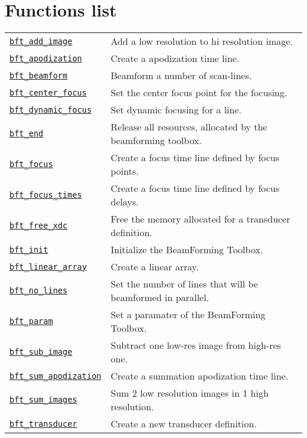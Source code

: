\documentclass{manual}
\begin{document}
\section{Functions list}
\begin{tabular}[t]{lp{14cm}}
 \hyperlink{bft_add_image}{\tt bft\_add\_image}      & Add a low resolution to hi resolution image.\\
 \hyperlink{bft_apodization}{\tt bft\_apodization}     & Create a  apodization time line. \\
 \hyperlink{bft_beamform}{\tt bft\_beamform}        & Beamform a number of scan-lines. \\
 \hyperlink{bft_center_focus}{\tt bft\_center\_focus}   & Set the center focus point for the focusing. \\
 \hyperlink{bft_dynamic_focus}{\tt bft\_dynamic\_focus}  & Set dynamic focusing for a line. \\
 \hyperlink{bft_end}{\tt bft\_end}             & Release all resources, allocated by the beamforming toolbox.\\
 \hyperlink{bft_focus}{\tt bft\_focus}           & Create a focus time line defined by focus points.\\
 \hyperlink{bft_focus_times}{\tt bft\_focus\_times}    & Create a focus time line defined by focus delays.\\
 \hyperlink{bft_free_xdc}{\tt bft\_free\_xdc}       & Free the memory allocated for a transducer definition.\\
 \hyperlink{bft_init}{\tt bft\_init}            & Initialize the BeamForming Toolbox.\\
 \hyperlink{bft_linear_array}{\tt bft\_linear\_array}   & Create a linear array.\\
 \hyperlink{bft_no_lines}{\tt bft\_no\_lines}       & Set the number of lines that will be beamformed in parallel.\\
 \hyperlink{bft_param}{\tt bft\_param}           & Set a paramater of the BeamForming Toolbox.\\
 \hyperlink{bft_sub_image}{\tt bft\_sub\_image}      & Subtract one low-res image from  high-res one.\\
 \hyperlink{bft_sum_apodization}{\tt bft\_sum\_apodization} & Create a summation apodization time line.\\
 \hyperlink{bft_sum_images}{\tt bft\_sum\_images}     & Sum 2 low resolution images in 1 high resolution.\\
 \hyperlink{bft_transducer}{\tt bft\_transducer}      & Create a new transducer definition.\\
\end{tabular}
\end{document}
